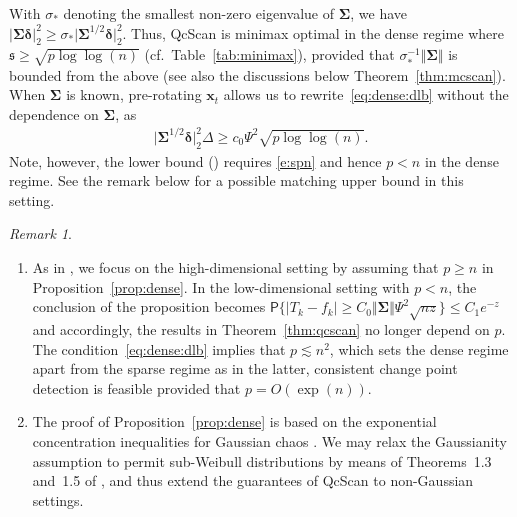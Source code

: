 \documentclass[11pt, a4paper]{article}
\newcommand{\mbf}{\mathbf}
\newcommand{\p}{\mathsf{P}}
\theoremstyle{definition}
\theoremstyle{definition}
\theoremstyle{definition}
\theoremstyle{definition}
\theoremstyle{definition}
\theoremstyle{remark}
\newtheorem{rem}{Remark}[section]
\theoremstyle{definition}
\theoremstyle{definition}
\theoremstyle{definition}
\begin{document}
With $\sigma_*$ denoting the smallest non-zero eigenvalue of $\bm\Sigma$, we have
$\vert \bm\Sigma \bm\delta \vert_2^2 \ge \sigma_* \vert \bm\Sigma^{1/2} \bm\delta \vert_2^2$.
Thus, QcScan is minimax optimal in the dense regime where $\mathfrak{s} \ge \sqrt{p{\log\log (n)}}$ (cf.\ Table~\ref{tab:minimax}), provided that $\sigma_*^{-1} \Vert \bm\Sigma \Vert$ is bounded from the above (see also the discussions below Theorem~\ref{thm:mcscan}).
When $\bm\Sigma$ is known, pre-rotating $\mbf x_t$ allows us to rewrite~\eqref{eq:dense:dlb} without the dependence on $\bm\Sigma$, as
\begin{align*}
\vert \bm\Sigma^{1/2} \bm\delta \vert_2^2 \Delta \ge c_0 \Psi^2 \sqrt{p\log\log(n)}.
\end{align*}
Note, however, the lower bound () requires \eqref{e:spn} and hence $p < n$ in the dense regime. See the remark below for a possible matching upper bound in this setting. 

\begin{rem}\label{r:qcscan}
\begin{enumerate}[label = (\alph*)]
\item\label{i:r:np} As in \cite{VeGa18}, we focus on the high-dimensional setting by assuming that $p \ge n$ in Proposition~\ref{prop:dense}.
In the low-dimensional setting with $p < n$, the conclusion of the proposition becomes $\p\{ \vert T_k - f_k \vert \ge C_0 \Vert \bm\Sigma \Vert \Psi^2 \sqrt{nz} \} \le C_1 e^{-z}$ and accordingly, the results in Theorem~\ref{thm:qcscan} no longer depend on $p$. 
The condition~\eqref{eq:dense:dlb} implies that $p \lesssim n^2$, which sets the dense regime apart from the sparse regime as in the latter, consistent change point detection is feasible provided that $p = O(\exp(n))$.

\item The proof of Proposition~\ref{prop:dense} is based on the exponential concentration inequalities for Gaussian chaos \citep{adamczak2015concentration}.
We may relax the Gaussianity assumption to permit sub-Weibull distributions by means of Theorems~1.3 and~1.5 of \cite{GSS21}, and thus extend the guarantees of QcScan to non-Gaussian settings. %
\end{enumerate}
\end{rem}
\end{document}
